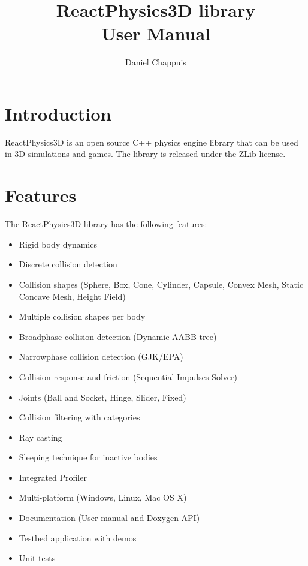 \documentclass[a4paper,12pt]{article}
\begin{document}
   \author{Daniel Chappuis}
   \title{ReactPhysics3D library \\ User Manual}
   \maketitle

   \tableofcontents

   \newpage


   \section{Introduction}

  ReactPhysics3D is an open source C++ physics engine library that can be used
  in 3D simulations and games. The library is released under the ZLib license.

   \section{Features}

   The ReactPhysics3D library has the following features:

   \begin{itemize}
    \item Rigid body dynamics
    \item Discrete collision detection
    \item Collision shapes (Sphere, Box, Cone, Cylinder, Capsule, Convex Mesh, Static Concave Mesh, Height Field)
    \item Multiple collision shapes per body
    \item Broadphase collision detection (Dynamic AABB tree)
    \item Narrowphase collision detection (GJK/EPA)
    \item Collision response and friction (Sequential Impulses Solver)
    \item Joints (Ball and Socket, Hinge, Slider, Fixed)
    \item Collision filtering with categories
    \item Ray casting
    \item Sleeping technique for inactive bodies
    \item Integrated Profiler
    \item Multi-platform (Windows, Linux, Mac OS X)
    \item Documentation (User manual and Doxygen API)
    \item Testbed application with demos
    \item Unit tests
   \end{itemize}
\end{document}

